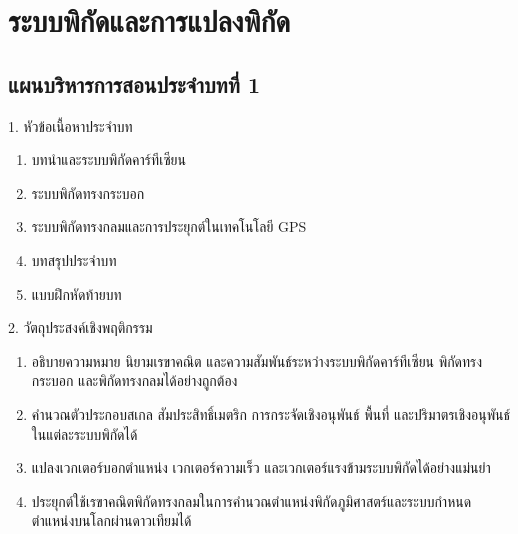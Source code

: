 \chapter{ระบบพิกัดและการแปลงพิกัด}

\section*{แผนบริหารการสอนประจำบทที่ 1}

\begin{planbox}[colframe=rbruNavy, colbacktitle=rbruNavy]{1. หัวข้อเนื้อหาประจำบท}
\begin{enumerate}[topsep=2pt, itemsep=1pt, partopsep=0pt, parsep=0pt, leftmargin=1.5em]
    \item บทนำและระบบพิกัดคาร์ทีเซียน
    \item ระบบพิกัดทรงกระบอก
    \item ระบบพิกัดทรงกลมและการประยุกต์ในเทคโนโลยี GPS
    \item บทสรุปประจำบท
    \item แบบฝึกหัดท้ายบท
\end{enumerate}
\end{planbox}

\begin{planbox}[colframe=rbruGreen, colbacktitle=rbruGreen]{2. วัตถุประสงค์เชิงพฤติกรรม}
\begin{enumerate}[topsep=2pt, itemsep=1pt, partopsep=0pt, parsep=0pt, leftmargin=1.5em]
    \item อธิบายความหมาย นิยามเรขาคณิต และความสัมพันธ์ระหว่างระบบพิกัดคาร์ทีเซียน พิกัดทรงกระบอก และพิกัดทรงกลมได้อย่างถูกต้อง
    \item คำนวณตัวประกอบสเกล สัมประสิทธิ์เมตริก การกระจัดเชิงอนุพันธ์ พื้นที่ และปริมาตรเชิงอนุพันธ์ในแต่ละระบบพิกัดได้
    \item แปลงเวกเตอร์บอกตำแหน่ง เวกเตอร์ความเร็ว และเวกเตอร์แรงข้ามระบบพิกัดได้อย่างแม่นยำ
    \item ประยุกต์ใช้เรขาคณิตพิกัดทรงกลมในการคำนวณตำแหน่งพิกัดภูมิศาสตร์และระบบกำหนดตำแหน่งบนโลกผ่านดาวเทียมได้
\end{enumerate}
\end{planbox}

